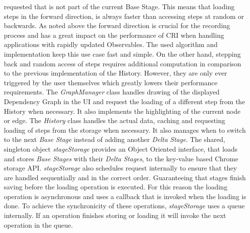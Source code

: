 requested that is not part of the current Base Stage. This means that loading steps in the forward direction, is always faster than accessing steps at random or backwards. As noted above the forward direction is crucial for the recording process and has a great impact on the performance of CRI when handling applications with rapidly updated Observables. The used algorithm and implementation keep this use case fast and simple. On the other hand, stepping back and random access of steps requires additional computation in comparison to the previous implementation of the History. However, they are only ever triggered by the user themselves which greatly lowers their performance requirements.
The \emph{GraphManager} class handles drawing of the displayed Dependency Graph in the UI and request the loading of a different step from the History when necessary. It also implements the highlighting of the current node or edge. The \emph{History} class handles the actual data, caching and requesting loading of steps from the storage when necessary. It also manages when to switch to the next \emph{Base Stage} instead of adding another \emph{Delta Stage}. The shared, singleton object \emph{stageStorage} provides an Object Oriented interface, that loads and stores \emph{Base Stages} with their \emph{Delta Stages}, to the key-value based Chrome storage API. \emph{stageStorage} also schedules request internally to ensure that they are handled sequentially and in the correct order. Guaranteeing that stages finish saving before the loading operation is executed. For this reason the loading operation is asynchronous and uses a callback that is invoked when the loading is done. To achieve the synchronicity of these operations, \emph{stageStorage} uses a queue internally. If an operation finishes storing or loading it will invoke the next operation in the queue.	
	
